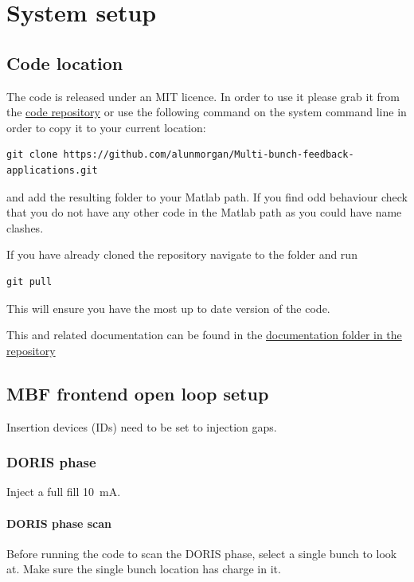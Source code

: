 \documentclass{report}
\begin{document}
\chapter{System setup}
\section{Code location }
The code is released under an MIT licence. In order to use it please grab it from the \href{https://github.com/alunmorgan/Multi-bunch-feedback-applications}{code repository}
or use the following command on the system command line in order to copy it to your current location:
\begin{verbatim}
git clone https://github.com/alunmorgan/Multi-bunch-feedback-applications.git
\end{verbatim}
and add the resulting folder to your Matlab path. If you find odd behaviour check that you do not have any other code in the Matlab path as you could have name clashes.

If you have already cloned the repository navigate to the folder and run 
\begin{verbatim}
git pull
\end{verbatim}
This will ensure you have the most up to date version of the code.

This and related documentation can be found in the \href{https://github.com/alunmorgan/Multi-bunch-feedback-applications/Documentation}{documentation folder in the repository}

\section{MBF frontend open loop setup}
\begin{tcolorbox}[colback=blue!5!white, colframe=blue!75!black, title=\textbf{Machine settings}]
  Insertion devices (IDs) need to be set to injection gaps.  
\end{tcolorbox}
 
\subsection{DORIS phase}
\begin{tcolorbox}[colback=blue!5!white, colframe=blue!75!black, title=\textbf{Machine settings}]
Inject a full fill 10~mA.
\end{tcolorbox}
\subsubsection{DORIS phase scan}
Before running the code to scan the DORIS phase, select a single bunch to look at.
Make sure the single bunch location has charge in it.
\end{document}
